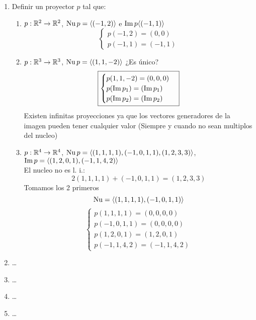 \documentclass[../practica.root.tex]{subfiles}
\begin{document}
\begin{enumerate}
    \item Definir un proyector $p$ tal que:
          \begin{enumerate}
              \item \( p : \mathbb{R}^2 \to \mathbb{R}^2 \), \( \operatorname{Nu} p = \langle (-1,2) \rangle \) e \( \operatorname{Im} p \langle (-1,1) \rangle \)
                    \[
                        \boxed{
                            \begin{cases}
                                p(-1,2) = (0,0) \\
                                p(-1,1) = (-1,1)
                            \end{cases}
                        }
                    \]
              \item \( p : \mathbb{R}^3 \to \mathbb{R}^3 \), \( \operatorname{Nu} p = \langle (1,1,-2) \rangle \) ¿Es único?
                    \[
                        \boxed{
                            \begin{cases}
                                p(1,1,-2) = (0,0,0)      \\
                                p(\operatorname{Im} p_1) = (\operatorname{Im} p_1) \\
                                p(\operatorname{Im} p_2) = (\operatorname{Im} p_2)
                            \end{cases}
                        }
                    \]
                    Existen infinitas proyecciones ya que los vectores generadores de la imagen pueden tener cualquier valor (Siempre y cuando no sean multiplos del nucleo)
              \item \( p : \mathbb{R}^4 \to \mathbb{R}^4 \), \( \operatorname{Nu} p = \langle (1,1,1,1),(-1,0,1,1),(1,2,3,3) \rangle \), \( \operatorname{Im} p = \langle (1,2,0,1),(-1,1,4,2) \rangle \) \\
                    El nucleo no es l. i.:
                    \[ 2(1,1,1,1) + (-1,0,1,1) = (1,2,3,3) \]
                    Tomamos los 2 primeros
                    \[ \operatorname{Nu} = \langle (1,1,1,1),(-1,0,1,1) \rangle \]
                    \[
                        \boxed{
                            \begin{cases}
                                p(1,1,1,1) = (0,0,0,0)  \\
                                p(-1,0,1,1) = (0,0,0,0) \\
                                p(1,2,0,1) = (1,2,0,1)  \\
                                p(-1,1,4,2) = (-1,1,4,2)
                            \end{cases}
                        }
                    \]
          \end{enumerate}
    \item \dots
    \item \dots
    \item \dots
    \item \dots
\end{enumerate}
\end{document}

